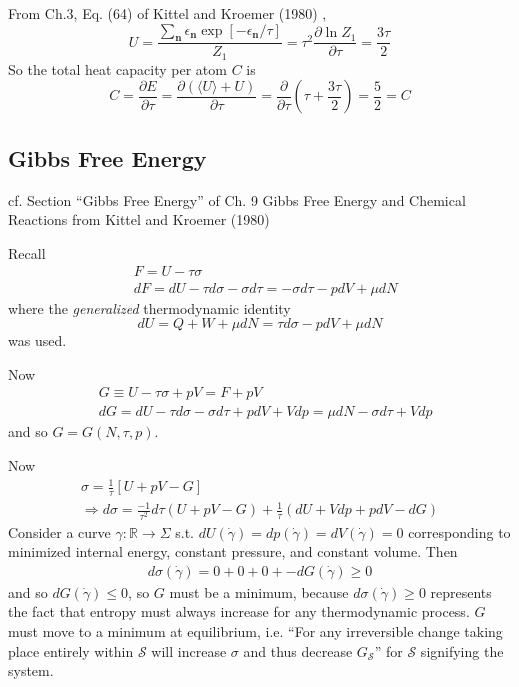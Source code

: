 \documentclass[10pt]{amsart}
\begin{document}
\begin{multicols*}{2}
From Ch.3, Eq. (64) of Kittel and Kroemer (1980) \cite{CKittelHKroemer1980}, 
\[
U = \frac{ \sum_{\mathbf{n}} \epsilon_{\mathbf{n}} \exp{ \left[ -\epsilon_{\mathbf{n}} /\tau \right] } }{Z_1} = \tau^2 \frac{ \partial \ln{Z_1}}{\partial \tau } = \frac{3\tau}{2}
\]
So the total heat capacity per atom $C$ is 
\[
C = \frac{ \partial E}{ \partial \tau} = \frac{ \partial ( \langle U \rangle + U ) }{ \partial \tau } = \frac{ \partial }{ \partial \tau} ( \tau + \frac{3\tau}{2} ) = \boxed{ \frac{5}{2}  = C}
\]

\subsection{Gibbs Free Energy}

cf. Section ``Gibbs Free Energy'' of Ch. 9 Gibbs Free Energy and Chemical Reactions from Kittel and Kroemer (1980) \cite{CKittelHKroemer1980}

Recall 
\[
\begin{aligned}
  & F = U- \tau \sigma \\ 
  & dF = dU - \tau d\sigma - \sigma d\tau = - \sigma d\tau -pdV + \mu dN
\end{aligned}
\]
where the \emph{generalized} thermodynamic identity
\[
dU = Q + W + \mu dN = \tau d\sigma - pdV + \mu dN
\]
was used. 

Now
\[
\begin{aligned}
  & G \equiv U - \tau \sigma + pV = F + pV \\ 
  & dG = dU - \tau d\sigma - \sigma d\tau + pdV + Vdp = \mu dN - \sigma d\tau + Vdp
\end{aligned}
\]
and so $G = G(N,\tau , p)$.  

Now \[
\begin{gathered}
  \sigma = \frac{1}{\tau} [ U +pV - G ] \\
  \Longrightarrow d\sigma = \frac{-1}{\tau^2} d\tau ( U + pV - G) + \frac{1}{\tau} (dU + V dp + pdV - dG)
\end{gathered}
\]
Consider a curve $\gamma : \mathbb{R} \to \Sigma$ s.t. $dU(\dot{\gamma}) = dp(\dot{\gamma}) = dV(\dot{\gamma})=0$ corresponding to minimized internal energy, constant pressure, and constant volume.  Then
\[
\begin{gathered}
  d\sigma(\dot{\gamma}) = 0 + 0 + 0 + -dG(\dot{\gamma}) \geq 0 
\end{gathered}
\]
and so $dG(\dot{\gamma}) \leq 0$, so $G$ must be a minimum, because $d\sigma(\dot{\gamma}) \geq 0$ represents the fact that entropy must always increase for any thermodynamic process.  $G$ must move to a minimum at equilibrium, i.e. ``For any irreversible change taking place entirely within $\mathcal{S}$ will increase $\sigma$ and thus decrease $G_{\mathcal{S}}$'' \cite{CKittelHKroemer1980} for $\mathcal{S}$ signifying the system.  


\end{multicols*}
\end{document}
